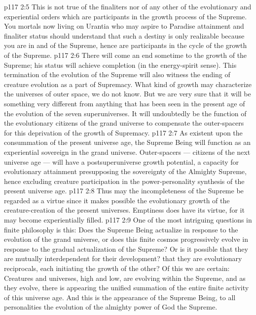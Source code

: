 \vs p117 2:5 This is not true of the finaliters nor of any other of the evolutionary and experiential orders which are participants in the growth process of the Supreme. You mortals now living on Urantia who may aspire to Paradise attainment and finaliter status should understand that such a destiny is only realizable because you are in and of the Supreme, hence are participants in the cycle of the growth of the Supreme.
\vs p117 2:6 \pc There will come an end sometime to the growth of the Supreme; his status will achieve completion (in the energy\hyp{}spirit sense). This termination of the evolution of the Supreme will also witness the ending of creature evolution as a part of Supremacy. What kind of growth may characterize the universes of outer space, we do not know. But we are very sure that it will be something very different from anything that has been seen in the present age of the evolution of the seven superuniverses. It will undoubtedly be the function of the evolutionary citizens of the grand universe to compensate the outer\hyp{}spacers for this deprivation of the growth of Supremacy.
\vs p117 2:7 As existent upon the consummation of the present universe age, the Supreme Being will function as an experiential sovereign in the grand universe. Outer\hyp{}spacers --- citizens of the next universe age --- will have a postsuperuniverse growth potential, a capacity for evolutionary attainment presupposing the sovereignty of the Almighty Supreme, hence excluding creature participation in the power\hyp{}personality synthesis of the present universe age.
\vs p117 2:8 Thus may the incompleteness of the Supreme be regarded as a virtue since it makes possible the evolutionary growth of the creature\hyp{}creation of the present universes. Emptiness does have its virtue, for it may become experientially filled.
\vs p117 2:9 \pc One of the most intriguing questions in finite philosophy is this: Does the Supreme Being actualize in response to the evolution of the grand universe, or does this finite cosmos progressively evolve in response to the gradual actualization of the Supreme? Or is it possible that they are mutually interdependent for their development? that they are evolutionary reciprocals, each initiating the growth of the other? Of this we are certain: Creatures and universes, high and low, are evolving within the Supreme, and as they evolve, there is appearing the unified summation of the entire finite activity of this universe age. And this is the appearance of the Supreme Being, to all personalities the evolution of the almighty power of God the Supreme.
